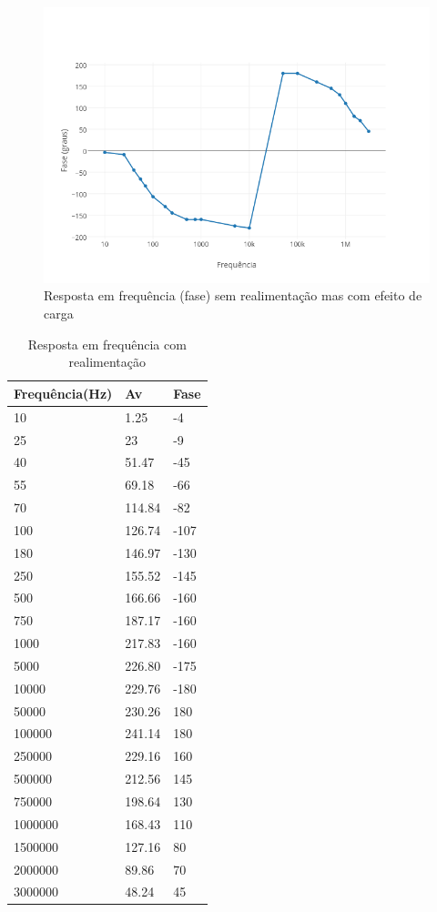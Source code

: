 \documentclass[openright]{normas-utf-tex} %
\begin{document}
\begin{figure}[H]
\centering
\includegraphics[width=0.8\linewidth]{img/SemReal_Fase.png}
\caption{Resposta em frequência (fase) sem realimentação mas com efeito de carga}
\label{fig:resp_freq_sem_real_fase}
\end{figure}

\begin{table}[H]
\centering
\caption{Resposta em frequência com realimentação}
\label{tab:resp_freq_com_realimentacao}
\begin{tabular}{ | l | l | l | }
\hline
	Frequência(Hz) & Av & Fase \\ \hline
	10 & 1.25 & -4 \\ \hline
	25 & 23 & -9 \\ \hline
	40 & 51.47 & -45 \\ \hline
	55 & 69.18 & -66 \\ \hline
	70 & 114.84 & -82 \\ \hline
	100 & 126.74 & -107 \\ \hline
	180 & 146.97 & -130 \\ \hline
	250 & 155.52 & -145 \\ \hline
	500 & 166.66 & -160 \\ \hline
	750 & 187.17 & -160 \\ \hline
	1000 & 217.83 & -160 \\ \hline
	5000 & 226.80 & -175 \\ \hline
	10000 & 229.76 & -180 \\ \hline
	50000 & 230.26 & 180 \\ \hline
	100000 & 241.14 & 180 \\ \hline
	250000 & 229.16 & 160 \\ \hline
	500000 & 212.56 & 145 \\ \hline
	750000 & 198.64 & 130 \\ \hline
	1000000 & 168.43 & 110 \\ \hline
	1500000 & 127.16 & 80 \\ \hline
	2000000 & 89.86 & 70 \\ \hline
	3000000 & 48.24 & 45 \\ \hline
\end{tabular}
\end{table}
\end{document}
